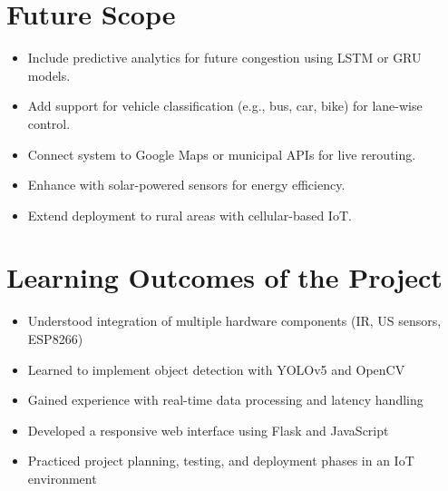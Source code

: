 \documentclass[12pt]{report}
\begin{document}
\section{Future Scope}
\begin{itemize}
\item Include predictive analytics for future congestion using LSTM or GRU models.
\item Add support for vehicle classification (e.g., bus, car, bike) for lane-wise control.
\item Connect system to Google Maps or municipal APIs for live rerouting.
\item Enhance with solar-powered sensors for energy efficiency.
\item Extend deployment to rural areas with cellular-based IoT.
\end{itemize}

\section{Learning Outcomes of the Project}
\begin{itemize}
\item Understood integration of multiple hardware components (IR, US sensors, ESP8266)
\item Learned to implement object detection with YOLOv5 and OpenCV
\item Gained experience with real-time data processing and latency handling
\item Developed a responsive web interface using Flask and JavaScript
\item Practiced project planning, testing, and deployment phases in an IoT environment
\end{itemize}
\end{document}
